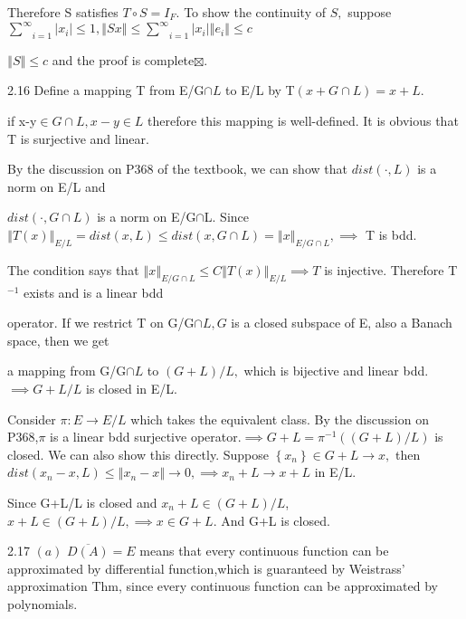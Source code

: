 \documentclass{article}
\begin{document}
Therefore S satisfies $T\circ S=I_{F}.$ To show the continuity of $S,$%
suppose $\underset{i=1}{\overset{\infty }{\sum }}\left\vert x_{i}\right\vert
\leq 1,\left\Vert Sx\right\Vert \leq \underset{i=1}{\overset{\infty }{\sum }}%
\left\vert x_{i}\right\vert \left\Vert e_{i}\right\Vert \leq c$

\bigskip $\left\Vert S\right\Vert \leq c$ and the proof is complete$%
\boxtimes .$

2.16 Define a mapping T from E/G$\cap L$ to E/L by T$\left( x+G\cap L\right)
=x+L.$ 

\bigskip if x-y$\in G\cap L,x-y\in L$ therefore this mapping is
well-defined. It is obvious that T is surjective and linear.

By the discussion on P368 of the textbook, we can show that $dist\left(
\cdot ,L\right) $ is a norm on E/L and

$dist\left( \cdot ,G\cap L\right) $ is a norm on E/G$\cap $L. Since $%
\left\Vert T\left( x\right) \right\Vert _{E/L}=dist\left( x,L\right) \leq
dist\left( x,G\cap L\right) =\left\Vert x\right\Vert _{E/G\cap L},\implies $%
T is bdd.

The condition says that $\left\Vert x\right\Vert _{E/G\cap L}\leq
C\left\Vert T\left( x\right) \right\Vert _{E/L}\implies T$ is injective.
Therefore T$^{-1}$ exists and is a linear bdd

operator. If we restrict T on G/G$\cap L,G$ is a closed subspace of E, also
a Banach space, then we get

a mapping from G/G$\cap L$ to $\left( G+L\right) /L,$ which is bijective and
linear bdd. $\implies G+L/L$ is closed in E/L.

Consider $\pi :E\rightarrow E/L$ which takes the equivalent class. By the
discussion on P368,$\pi $ is a linear bdd surjective operator.$\implies
G+L=\pi ^{-1}\left( \left( G+L\right) /L\right) $ is closed. We can also
show this directly. Suppose $\left\{ x_{n}\right\} \in G+L\rightarrow x,$%
then $dist\left( x_{n}-x,L\right) \leq \left\Vert x_{n}-x\right\Vert
\rightarrow 0,\implies x_{n}+L\rightarrow x+L$ in E/L.

Since G+L/L is closed and $x_{n}+L\in \left( G+L\right) /L$, $x+L\in \left(
G+L\right) /L,\implies x\in G+L.$ And G+L is closed.        

2.17 $\left( a\right) $ $\overline{D\left( A\right) }=E$ means that every
continuous function can be approximated by differential function,which is
guaranteed by Weistrass' approximation Thm, since every continuous function
can be approximated by polynomials.
\end{document}
